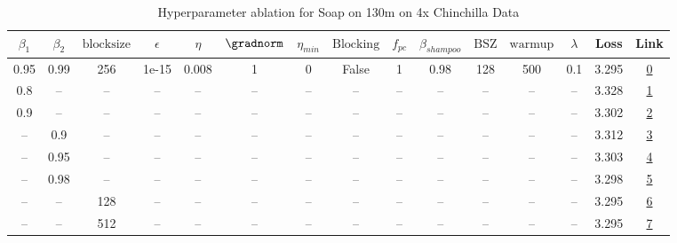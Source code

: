 \begin{table}[H]
\centering
\caption{Hyperparameter ablation for Soap on 130m on 4x Chinchilla Data}
\label{tab:ablation_soap_130m_on_4x_chinchilla_data}
\begin{tabular}{ccccccccccccccc}
\toprule
$\beta_1$ & $\beta_2$ & $\mathrm{block size}$ & $\epsilon$ & $\eta$ & $\gradnorm$ & $\eta_{min}$ & $\mathrm{Blocking}$ & $f_{pc}$ & $\beta_{shampoo}$ & $\mathrm{BSZ}$ & $\mathrm{warmup}$ & $\lambda$ & Loss & Link \\
\midrule
0.95 & 0.99 & 256 & 1e-15 & 0.008 & 1 & 0 & False & 1 & 0.98 & 128 & 500 & 0.1 & 3.295 & \href{https://wandb.ai/stanford-mercury/optimizer-scaling/runs/sweep-130m-10B-soapb00b89lr0.008-wd0.1-minlr0-warmup500-b10.95-b-6e13fd}{0} \\
\midrule
0.8 & -- & -- & -- & -- & -- & -- & -- & -- & -- & -- & -- & -- & 3.328 & \href{https://wandb.ai/stanford-mercury/optimizer-scaling/runs/sweep-130m-10B-soap39d934lr0.008-wd0.1-minlr0-warmup500-b10.8-b2-b9ae87}{1} \\
0.9 & -- & -- & -- & -- & -- & -- & -- & -- & -- & -- & -- & -- & 3.302 & \href{https://wandb.ai/stanford-mercury/optimizer-scaling/runs/sweep-130m-10B-soapf71ee4lr0.008-wd0.1-minlr0-warmup500-b10.9-b2-6ccd24}{2} \\
-- & 0.9 & -- & -- & -- & -- & -- & -- & -- & -- & -- & -- & -- & 3.312 & \href{https://wandb.ai/stanford-mercury/optimizer-scaling/runs/sweep-130m-10B-soap2fe7delr0.008-wd0.1-minlr0-warmup500-b10.95-b-1ba13a}{3} \\
-- & 0.95 & -- & -- & -- & -- & -- & -- & -- & -- & -- & -- & -- & 3.303 & \href{https://wandb.ai/stanford-mercury/optimizer-scaling/runs/sweep-130m-10B-soap7a5708lr0.008-wd0.1-minlr0-warmup500-b10.95-b-0ed803}{4} \\
-- & 0.98 & -- & -- & -- & -- & -- & -- & -- & -- & -- & -- & -- & 3.298 & \href{https://wandb.ai/stanford-mercury/optimizer-scaling/runs/sweep-130m-10B-soap565dbblr0.008-wd0.1-minlr0-warmup500-b10.95-b-6a88a8}{5} \\
-- & -- & 128 & -- & -- & -- & -- & -- & -- & -- & -- & -- & -- & 3.295 & \href{https://wandb.ai/stanford-mercury/optimizer-scaling/runs/sweep-130m-10B-soap25235clr0.008-wd0.1-minlr0-warmup500-b10.95-b-54f40d}{6} \\
-- & -- & 512 & -- & -- & -- & -- & -- & -- & -- & -- & -- & -- & 3.295 & \href{https://wandb.ai/stanford-mercury/optimizer-scaling/runs/sweep-130m-10B-soap8ed7d6lr0.008-wd0.1-minlr0-warmup500-b10.95-b-764133}{7} \\

\end{tabular}
\end{table}

